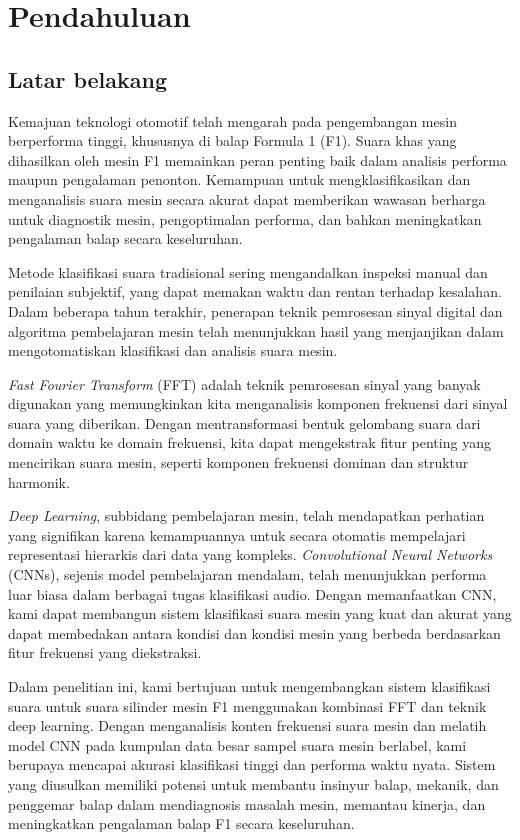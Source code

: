 \section{Pendahuluan}
\subsection{Latar belakang}

Kemajuan teknologi otomotif telah mengarah pada pengembangan mesin berperforma tinggi, khususnya di balap Formula 1 (F1). Suara khas yang dihasilkan oleh mesin F1 memainkan peran penting baik dalam analisis performa maupun pengalaman penonton. Kemampuan untuk mengklasifikasikan dan menganalisis suara mesin secara akurat dapat memberikan wawasan berharga untuk diagnostik mesin, pengoptimalan performa, dan bahkan meningkatkan pengalaman balap secara keseluruhan. \newline

Metode klasifikasi suara tradisional sering mengandalkan inspeksi manual dan penilaian subjektif, yang dapat memakan waktu dan rentan terhadap kesalahan. Dalam beberapa tahun terakhir, penerapan teknik pemrosesan sinyal digital dan algoritma pembelajaran mesin telah menunjukkan hasil yang menjanjikan dalam mengotomatiskan klasifikasi dan analisis suara mesin. \newline

\textit{Fast Fourier Transform} (FFT) adalah teknik pemrosesan sinyal yang banyak digunakan yang memungkinkan kita menganalisis komponen frekuensi dari sinyal suara yang diberikan. Dengan mentransformasi bentuk gelombang suara dari domain waktu ke domain frekuensi, kita dapat mengekstrak fitur penting yang mencirikan suara mesin, seperti komponen frekuensi dominan dan struktur harmonik. \newline

\textit{Deep Learning}, subbidang pembelajaran mesin, telah mendapatkan perhatian yang signifikan karena kemampuannya untuk secara otomatis mempelajari representasi hierarkis dari data yang kompleks. \textit{Convolutional Neural Networks} (CNNs), sejenis model pembelajaran mendalam, telah menunjukkan performa luar biasa dalam berbagai tugas klasifikasi audio. Dengan memanfaatkan CNN, kami dapat membangun sistem klasifikasi suara mesin yang kuat dan akurat yang dapat membedakan antara kondisi dan kondisi mesin yang berbeda berdasarkan fitur frekuensi yang diekstraksi. \newline

Dalam penelitian ini, kami bertujuan untuk mengembangkan sistem klasifikasi suara untuk suara silinder mesin F1 menggunakan kombinasi FFT dan teknik deep learning. Dengan menganalisis konten frekuensi suara mesin dan melatih model CNN pada kumpulan data besar sampel suara mesin berlabel, kami berupaya mencapai akurasi klasifikasi tinggi dan performa waktu nyata. Sistem yang diusulkan memiliki potensi untuk membantu insinyur balap, mekanik, dan penggemar balap dalam mendiagnosis masalah mesin, memantau kinerja, dan meningkatkan pengalaman balap F1 secara keseluruhan.

